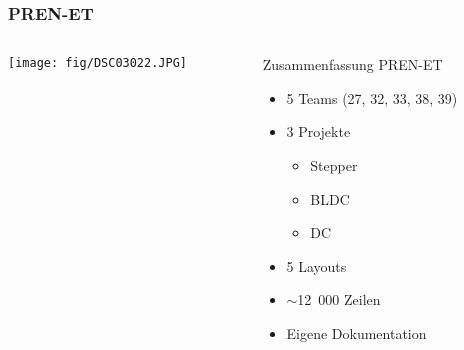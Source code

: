 \begin{frame}
    \frametitle{PREN-ET}
    \begin{columns}
        \begin{column}{0.50\textwidth}
            \centering
            \texttt{[image: fig/DSC03022.JPG]}
        \end{column}
        \begin{column}{0.50\textwidth}
            \begin{block}{Zusammenfassung PREN-ET}
                \begin{itemize}
                    \item 5 Teams (27, 32, 33, 38, 39)
                    \item 3 Projekte
                    \begin{itemize}
                        \item Stepper
                        \item BLDC
                        \item DC
                    \end{itemize}
                    \item 5 Layouts
                    \item $\sim$12~000 Zeilen %
                    \item Eigene Dokumentation
                \end{itemize}
            \end{block}
        \end{column}
    \end{columns}
\end{frame}
